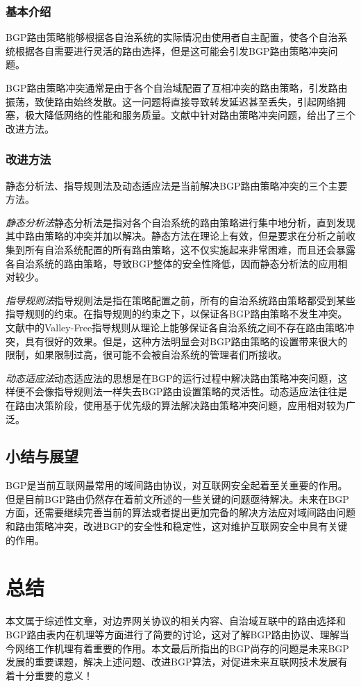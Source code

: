 \documentclass[11pt,twocolumn]{article}
\begin{document}
\subsubsection{基本介绍}
BGP路由策略能够根据各自治系统的实际情况由使用者自主配置，使各个自治系统根据各自需要进行灵活的路由选择，但是这可能会引发BGP路由策略冲突问题。

BGP路由策略冲突通常是由于各个自治域配置了互相冲突的路由策略，引发路由振荡，致使路由始终发散\cite{RouteO}。这一问题将直接导致转发延迟甚至丢失，引起网络拥塞，极大降低网络的性能和服务质量。文献\cite{Strategy}中针对路由策略冲突问题，给出了三个改进方法。

\subsubsection{改进方法}
静态分析法、指导规则法及动态适应法是当前解决BGP路由策略冲突的三个主要方法。

\emph{静态分析法}\quad 静态分析法是指对各个自治系统的路由策略进行集中地分析，直到发现其中路由策略的冲突并加以解决。静态方法在理论上有效，但是要求在分析之前收集到所有自治系统配置的所有路由策略，这不仅实施起来非常困难，而且还会暴露各自治系统的路由策略，导致BGP整体的安全性降低，因而静态分析法的应用相对较少。

\emph{指导规则法}\quad 指导规则法是指在策略配置之前，所有的自治系统路由策略都受到某些指导规则的约束。在指导规则的约束之下，以保证各BGP路由策略不发生冲突。文献\cite{VF}中的Valley-Free指导规则从理论上能够保证各自治系统之间不存在路由策略冲突，具有很好的效果。但是，这种方法明显会对BGP路由策略的设置带来很大的限制，如果限制过高，很可能不会被自治系统的管理者们所接收。

\emph{动态适应法}\quad 动态适应法的思想是在BGP的运行过程中解决路由策略冲突问题，这样便不会像指导规则法一样失去BGP路由设置策略的灵活性。动态适应法往往是在路由决策阶段，使用基于优先级的算法解决路由策略冲突问题，应用相对较为广泛。

\subsection{小结与展望}
BGP是当前互联网最常用的域间路由协议，对互联网安全起着至关重要的作用。但是目前BGP路由仍然存在着前文所述的一些关键的问题亟待解决。未来在BGP方面，还需要继续完善当前的算法或者提出更加完备的解决方法应对域间路由问题和路由策略冲突，改进BGP的安全性和稳定性，这对维护互联网安全中具有关键的作用。

\section{总结}
本文属于综述性文章，对边界网关协议的相关内容、自治域互联中的路由选择和BGP路由表内在机理等方面进行了简要的讨论，这对了解BGP路由协议、理解当今网络工作机理有着重要的作用。本文最后所指出的BGP尚存的问题是未来BGP发展的重要课题，解决上述问题、改进BGP算法，对促进未来互联网技术发展有着十分重要的意义！
\end{document}
